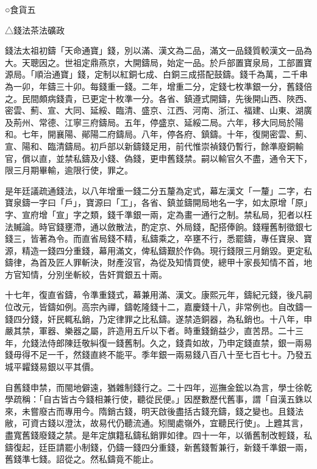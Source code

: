 
\begin{pinyinscope}
○食貨五

△錢法茶法礦政

錢法太祖初鑄「天命通寶」錢，別以滿、漢文為二品，滿文一品錢質較漢文一品為大。天聰因之。世祖定鼎燕京，大開鑄局，始定一品。於戶部置寶泉局，工部置寶源局。「順治通寶」錢，定制以紅銅七成、白銅三成搭配鼓鑄。錢千為萬，二千串為一卯，年鑄三十卯。每錢重一錢。二年，增重二分，定錢七枚準銀一分，舊錢倍之。民間頗病錢貴，已更定十枚準一分。各省、鎮遵式開鑄，先後開山西、陜西、密雲、薊、宣、大同、延綏、臨清、盛京、江西、河南、浙江、福建、山東、湖廣及荊州、常德、江寧三府鑄局。五年，停盛京、延綏二局。六年，移大同局於陽和。七年，開襄陽、鄖陽二府鑄局。八年，停各府、鎮鑄。十年，復開密雲、薊、宣、陽和、臨清鑄局。初戶部以新鑄錢足用，前代惟崇禎錢仍暫行，餘準廢銅輸官，償以直，並禁私鑄及小錢、偽錢，更申舊錢禁。嗣以輸官久不盡，通令天下，限三月期畢輸，逾限行使，罪之。

是年廷議疏通錢法，以八年增重一錢二分五釐為定式，幕左漢文「一釐」二字，右寶泉鑄一字曰「戶」，寶源曰「工」，各省、鎮並鑄開局地名一字，如太原增「原」字、宣府增「宣」字之類，錢千準銀一兩，定為畫一通行之制。禁私局，犯者以枉法贓論。時官錢壅滯，通以斂散法，酌定京、外局錢，配搭俸餉。錢糧舊制徵銀七錢三，皆著為令。而直省局錢不精，私鑄乘之，卒壅不行，悉罷鑄，專任寶泉、寶源，精造一錢四分重錢，幕用滿文，俾私鑄艱於作偽。現行錢限三月銷毀。更定私鑄律，為首及匠人罪斬決，財產沒官，為從及知情買使，總甲十家長知情不首，地方官知情，分別坐斬絞，告奸賞銀五十兩。

十七年，復直省鑄，令準重錢式，幕兼用滿、漢文。康熙元年，鑄紀元錢，後凡嗣位改元，皆鑄如例。高宗內禪，鑄乾隆錢十二，嘉慶錢十八，非常例也。自改鑄一錢四分錢，奸民輒私銷，乃定律罪之比私鑄。遂禁造銅器，為私銷也。十八年，申嚴其禁，軍器、樂器之屬，許造用五斤以下者。時重錢銷益少，直苦昂。二十三年，允錢法侍郎陳廷敬糾復一錢舊制。久之，錢貴如故，乃申定錢直禁，銀一兩易錢毋得不足一千，然錢直終不能平。季年銀一兩易錢八百八十至七百七十。乃發五城平糶錢易銀以平其價。

自舊錢申禁，而閩地僻遠，猶雜制錢行之。二十四年，巡撫金鋐以為言，學士徐乾學疏稱：「自古皆古今錢相兼行使，聽從民便。」因歷數歷代舊事，謂「自漢五銖以來，未嘗廢古而專用今。隋銷古錢，明天啟後盡括古錢充鑄，錢之變也。且錢法敝，可資古錢以澄汰，故易代仍聽流通。矧閩處嶺外，宜聽民行使」。上韙其言，盡寬舊錢廢錢之禁。是年定旗籍私鑄私銷罪如律。四十一年，以循舊制改輕錢，私鑄復起，廷臣請罷小制錢，仍鑄一錢四分重錢，新舊錢暫兼行，新錢千準銀一兩，舊錢準七錢。詔從之。然私鑄竟不能止。


\end{pinyinscope}
